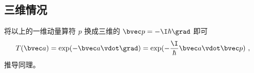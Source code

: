 \subsection{三维情况}
将以上的一维动量算符 $p$ 换成三维的 $\bvec p = -\I \hbar \grad$ 即可
\begin{equation}
T(\bvec a) = \exp(-\bvec a \vdot \grad) = \exp(-\frac{\I}{\hbar} \bvec a \vdot \bvec p)~,
\end{equation}
推导同理。









